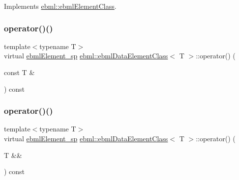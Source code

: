 Implements \mbox{\hyperlink{classebml_1_1ebmlElementClass_a223ede6b8bc3c85251d2d73f0256fb45}{ebml\+::ebml\+Element\+Class}}.

\mbox{\label{classebml_1_1ebmlDataElementClass_af50d05f41174fbac6efa1a8cbdc5b4fe}} 
\subsubsection{\texorpdfstring{operator()()}{operator()()}\hspace{0.1cm}{\footnotesize\ttfamily [1/2]}}
{\footnotesize\ttfamily template$<$typename T$>$ \\
virtual \mbox{\hyperlink{namespaceebml_adad533b7705a16bb360fe56380c5e7be}{ebml\+Element\+\_\+sp}} \mbox{\hyperlink{classebml_1_1ebmlDataElementClass}{ebml\+::ebml\+Data\+Element\+Class}}$<$ T $>$\+::operator() (\begin{DoxyParamCaption}\item[{const T \&}]{ }\end{DoxyParamCaption}) const\hspace{0.3cm}{\ttfamily [virtual]}}

\mbox{\label{classebml_1_1ebmlDataElementClass_a4e5efa44d8b7440b16bb3df7754c4544}} 
\subsubsection{\texorpdfstring{operator()()}{operator()()}\hspace{0.1cm}{\footnotesize\ttfamily [2/2]}}
{\footnotesize\ttfamily template$<$typename T$>$ \\
virtual \mbox{\hyperlink{namespaceebml_adad533b7705a16bb360fe56380c5e7be}{ebml\+Element\+\_\+sp}} \mbox{\hyperlink{classebml_1_1ebmlDataElementClass}{ebml\+::ebml\+Data\+Element\+Class}}$<$ T $>$\+::operator() (\begin{DoxyParamCaption}\item[{T \&\&}]{ }\end{DoxyParamCaption}) const\hspace{0.3cm}{\ttfamily [virtual]}}



